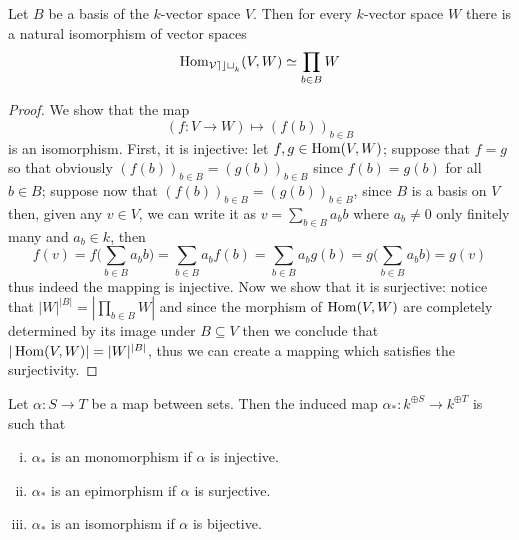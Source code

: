 \begin{proposition}
  Let \(B\) be a basis of the \(k\)-vector space \(V\). Then for every
  \(k\)-vector space \(W\) there is a natural isomorphism of vector spaces
  \[
    \operatorname{Hom}_{\mathcal{Vect}_k}(V, W) \simeq \prod_{b \in B} W
  \]
\end{proposition}

\begin{proof}
  We show that the map
  \[
    (f: V \to W) \longmapsto (f(b))_{b \in B}
  \]
  is an isomorphism. First, it is injective: let \(f, g \in \operatorname{Hom}(V, W)\);
  suppose that \(f = g\) so that obviously \((f(b))_{b \in B} = (g(b))_{b \in
  B}\) since \(f(b) = g(b)\) for all \(b \in B\); suppose now that \((f(b))_{b
  \in B} = (g(b))_{b \in B}\), since \(B\) is a basis on \(V\) then, given any
  \(v \in V\), we can write it as \(v = \sum_{b \in B} a_b b\) where \(a_b \neq
  0\) only finitely many and \(a_b \in k\), then
  \[
    f(v) = f\bigg(\sum_{b \in B} a_b b\bigg) = \sum_{b \in B} a_b f(b)
    = \sum_{b \in B} a_b g(b) = g\bigg(\sum_{b \in B} a_b b\bigg) = g(v)
  \]
  thus indeed the mapping is injective. Now we show that it is surjective:
  notice that \(|W|^{|B|} = \left| \prod_{b \in B} W \right|\) and since the
  morphism of \(\operatorname{Hom}(V, W)\) are completely determined by its image under \(B
  \subseteq V\) then we conclude that \(|\operatorname{Hom}(V, W)| = |W|^{|B|}\), thus we can
  create a mapping which satisfies the surjectivity.
\end{proof}

\begin{proposition}
  Let \(\alpha : S \to T\) be a map between sets. Then the induced map
  \(\alpha_\ast : k^{\oplus S} \to k^{\oplus T}\) is such that
  \begin{enumerate}[i.]
    \item \(\alpha_\ast\) is an monomorphism if \(\alpha\) is injective.
    \item \(\alpha_\ast\) is an epimorphism if \(\alpha\) is surjective.
    \item \(\alpha_\ast\) is an isomorphism if \(\alpha\) is bijective.
  \end{enumerate}
\end{proposition}

